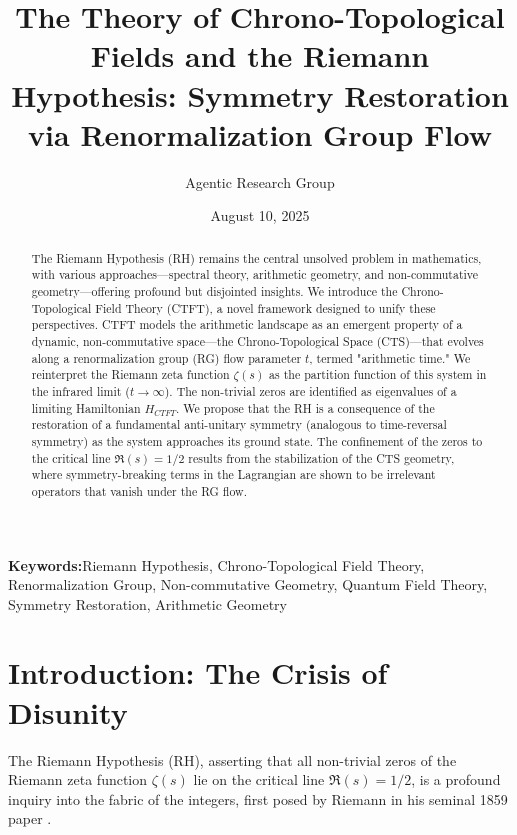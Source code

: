 \documentclass[11pt, a4paper]{article}
\title{The Theory of Chrono-Topological Fields and the Riemann Hypothesis: Symmetry Restoration via Renormalization Group Flow}
\author{Agentic Research Group}
\date{August 10, 2025}
\theoremstyle{definition}
\newcommand{\keywords}[1]{\par\addvspace\baselineskip\noindent\textbf{Keywords:}\enspace\ignorespaces#1}
\begin{document}
\maketitle

\begin{abstract}
The Riemann Hypothesis (RH) remains the central unsolved problem in mathematics, with various approaches—spectral theory, arithmetic geometry, and non-commutative geometry—offering profound but disjointed insights. We introduce the Chrono-Topological Field Theory (CTFT), a novel framework designed to unify these perspectives. CTFT models the arithmetic landscape as an emergent property of a dynamic, non-commutative space—the Chrono-Topological Space (CTS)—that evolves along a renormalization group (RG) flow parameter $t$, termed "arithmetic time." We reinterpret the Riemann zeta function $\zeta(s)$ as the partition function of this system in the infrared limit ($t\to\infty$). The non-trivial zeros are identified as eigenvalues of a limiting Hamiltonian $H_{CTFT}$. We propose that the RH is a consequence of the restoration of a fundamental anti-unitary symmetry (analogous to time-reversal symmetry) as the system approaches its ground state. The confinement of the zeros to the critical line $\Re(s) = 1/2$ results from the stabilization of the CTS geometry, where symmetry-breaking terms in the Lagrangian are shown to be irrelevant operators that vanish under the RG flow.
\end{abstract}

\keywords{Riemann Hypothesis, Chrono-Topological Field Theory, Renormalization Group, Non-commutative Geometry, Quantum Field Theory, Symmetry Restoration, Arithmetic Geometry}

\tableofcontents

\section{Introduction: The Crisis of Disunity}
The Riemann Hypothesis (RH), asserting that all non-trivial zeros of the Riemann zeta function $\zeta(s)$ lie on the critical line $\Re(s) = 1/2$, is a profound inquiry into the fabric of the integers, first posed by Riemann in his seminal 1859 paper \cite{Riemann1859}.
\end{document}
